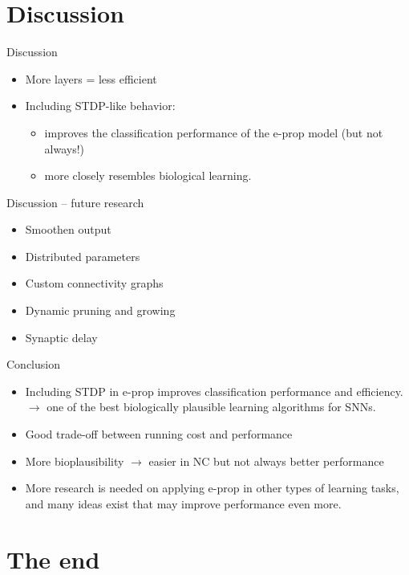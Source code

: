 \documentclass[t]{beamer}
\begin{document}
\section{Discussion}
\begin{frame}{Discussion}
  \begin{itemize}[label=--]
    \item More layers = less efficient
    \item Including STDP-like behavior:
    \begin{itemize}[label=--]
      \item improves the classification performance of the e-prop model (but not always!)
      \item more closely resembles biological learning.
    \end{itemize}
  \end{itemize}
\end{frame}

\begin{frame}{Discussion -- future research}
  \begin{itemize}[label=--]
    \item Smoothen output
    \item Distributed parameters
    \item Custom connectivity graphs
    \item Dynamic pruning and growing
    \item Synaptic delay
  \end{itemize}
\end{frame}

\begin{frame}{Conclusion}
  \begin{itemize}[label=--]
    \item Including STDP in e-prop improves classification performance and efficiency.\\
    $\rightarrow$ one of the best biologically plausible learning algorithms for SNNs.
    \item Good trade-off between running cost and performance
    \item More bioplausibility $\rightarrow$ easier in NC but not always better performance
    \item More research is needed on applying e-prop in other types of learning tasks, and many ideas exist that may improve performance even more.
  \end{itemize}
\end{frame}

\section{The end}
\begin{frame}{}
\end{frame}
\end{document}

